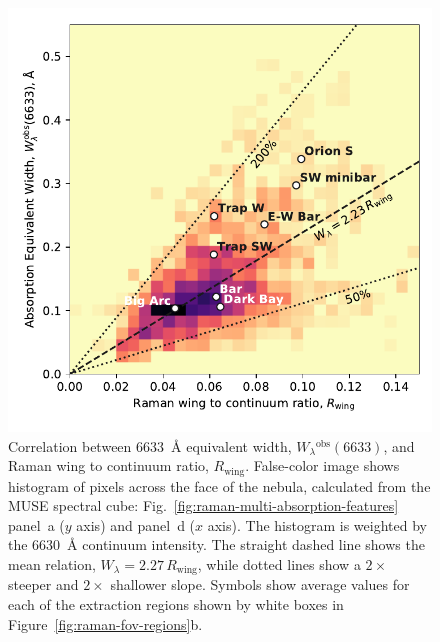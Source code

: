 \documentclass[useAMS, usenatbib, a4paper]{mnras}
\newcommand\wing{\ensuremath{_{\text{wing}}}}
\newcommand\observed{\ensuremath{^{\text{obs}}}}
\begin{document}
\begin{figure}
  \centering
  \includegraphics[width=\linewidth]{figs/correlation-6633-Rwing}
  \caption{
    Correlation between \SI{6633}{\angstrom} equivalent width,
    \(W_\lambda\observed(6633)\), and Raman wing to continuum ratio, \(R\wing\).
    False-color image shows histogram of pixels across the face of the nebula,
    calculated from the MUSE spectral cube: 
    Fig.~\ref{fig:raman-multi-absorption-features} panel~a (\(y\) axis)
    and panel~d (\(x\) axis).
    The histogram is  weighted by the \SI{6630}{\angstrom}
    continuum intensity.
    The straight dashed line shows the mean relation,
    \(W_\lambda = 2.27\, R\wing\),
    while dotted lines show a \(2 \times\) steeper and \(2 \times\) shallower slope.
    Symbols show average values for each of the extraction regions
    shown by white boxes in Figure~\ref{fig:raman-fov-regions}b.
  }
  \label{fig:6633-Rwing}
\end{figure}
\end{document}
